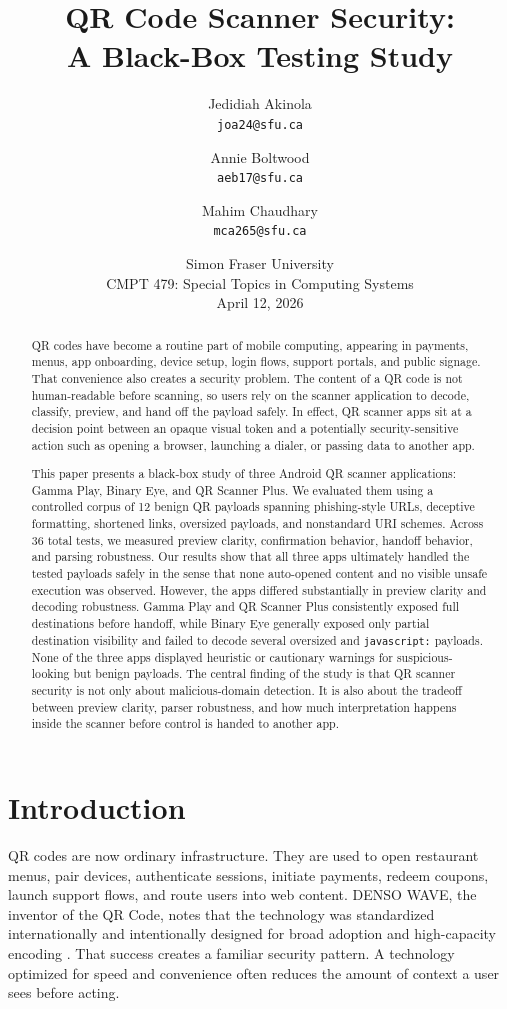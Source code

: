 \documentclass[11pt]{article}
\title{\textbf{QR Code Scanner Security: \\ A Black-Box Testing Study}}
\author{
Jedidiah Akinola\\
\texttt{joa24@sfu.ca}
\and
Annie Boltwood\\
\texttt{aeb17@sfu.ca}
\and
Mahim Chaudhary\\
\texttt{mca265@sfu.ca}
}
\date{Simon Fraser University\\CMPT 479: Special Topics in Computing Systems\\April 12, 2026}
\begin{document}
\maketitle

\begin{abstract}
QR codes have become a routine part of mobile computing, appearing in payments, menus, app onboarding, device setup, login flows, support portals, and public signage. That convenience also creates a security problem. The content of a QR code is not human-readable before scanning, so users rely on the scanner application to decode, classify, preview, and hand off the payload safely. In effect, QR scanner apps sit at a decision point between an opaque visual token and a potentially security-sensitive action such as opening a browser, launching a dialer, or passing data to another app.

This paper presents a black-box study of three Android QR scanner applications: Gamma Play, Binary Eye, and QR Scanner Plus. We evaluated them using a controlled corpus of 12 benign QR payloads spanning phishing-style URLs, deceptive formatting, shortened links, oversized payloads, and nonstandard URI schemes. Across 36 total tests, we measured preview clarity, confirmation behavior, handoff behavior, and parsing robustness. Our results show that all three apps ultimately handled the tested payloads safely in the sense that none auto-opened content and no visible unsafe execution was observed. However, the apps differed substantially in preview clarity and decoding robustness. Gamma Play and QR Scanner Plus consistently exposed full destinations before handoff, while Binary Eye generally exposed only partial destination visibility and failed to decode several oversized and \texttt{javascript:} payloads. None of the three apps displayed heuristic or cautionary warnings for suspicious-looking but benign payloads. The central finding of the study is that QR scanner security is not only about malicious-domain detection. It is also about the tradeoff between preview clarity, parser robustness, and how much interpretation happens inside the scanner before control is handed to another app.
\end{abstract}

\section{Introduction}

QR codes are now ordinary infrastructure. They are used to open restaurant menus, pair devices, authenticate sessions, initiate payments, redeem coupons, launch support flows, and route users into web content. DENSO WAVE, the inventor of the QR Code, notes that the technology was standardized internationally and intentionally designed for broad adoption and high-capacity encoding \cite{denso-standard,denso-overview}. That success creates a familiar security pattern. A technology optimized for speed and convenience often reduces the amount of context a user sees before acting.
\end{document}
